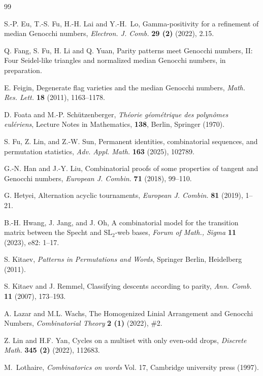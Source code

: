 \documentclass[11pt,reqno]{amsart}
\numberwithin{equation}{section}
\theoremstyle{plain}
\theoremstyle{definition}
\begin{document}
\begin{thebibliography}{99}
    

     S.-P. Eu, T.-S. Fu, H.-H. Lai and Y.-H.~Lo, Gamma-positivity for a refinement of median Genocchi numbers, {\em Electron. J. Comb.} {\bf29 (2)} (2022), 2.15.

     Q. Fang, S. Fu, H. Li and Q. Yuan, Parity patterns meet Genocchi numbers, II: Four Seidel-like triangles and normalized median Genocchi numbers, in preparation.

     E. Feigin, Degenerate flag varieties and the median Genocchi numbers, {\em Math. Res. Lett.} {\bf18} (2011), 1163--1178.
    
     D. Foata and M.-P. Sch\"utzenberger, {\it Th\'eorie g\'eom\'etrique des polyn\^omes eul\'eriens}, Lecture Notes in Mathematics, {\bf138}, Berlin, Springer (1970).

     S. Fu, Z. Lin, and Z.-W. Sun, Permanent identities, combinatorial sequences, and permutation statistics, {\em Adv. Appl. Math.} {\bf163} (2025), 102789.

     G.-N. Han and J.-Y. Liu, Combinatorial proofs of some properties of tangent and Genocchi numbers, {\em European J. Combin.} {\bf71} (2018), 99--110.

     G. Hetyei, Alternation acyclic tournaments, {\em European J. Combin.} {\bf81} (2019), 1--21.

     B.-H. Hwang, J. Jang, and J. Oh, A combinatorial model for the transition matrix between the Specht and $\mathrm{SL_2}$-web bases, {\em Forum of Math., Sigma} {\bf11} (2023), e82: 1--17.
    
    
    
     S. Kitaev, {\it Patterns in Permutations and Words}, Springer Berlin, Heidelberg (2011).

     S. Kitaev and J. Remmel, Classifying descents according to parity, {\em Ann. Comb.} {\bf11} (2007), 173--193.

     A. Lazar and M.L. Wachs, The Homogenized Linial Arrangement and Genocchi Numbers, {\em Combinatorial Theory} {\bf2 (1)} (2022), \#2.

     Z. Lin and H.F. Yan, Cycles on a multiset with only even-odd drops, {\em Discrete Math.} {\bf345 (2)} (2022), 112683.

     M.~Lothaire, {\it Combinatorics on words} Vol. 17, Cambridge university press (1997).
    

\end{thebibliography}
\end{document}
